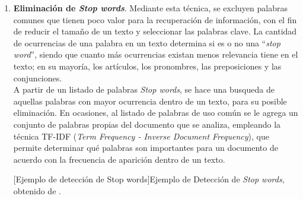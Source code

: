 \begin{enumerate}
\item \textbf{Eliminación de \textit{Stop words}}. Mediante esta técnica, se excluyen palabras comunes que tienen poco valor para la recuperación de información, con el fin de reducir el tamaño de un texto y seleccionar las palabras clave. La cantidad de ocurrencias de una palabra en un texto determina si es o no una “\textit{stop word}”, siendo que cuanto más ocurrencias existan menos relevancia tiene en el texto; en su mayoría, los artículos, los pronombres, las preposiciones y las conjunciones.\\

A partir de un listado de palabras \textit{Stop words}, se hace una busqueda de aquellas palabras con mayor ocurrencia dentro de un texto, para su posible eliminación. En ocasiones, al listado de palabras de uso común se le agrega un conjunto de palabras propias del documento que se analiza, empleando la técnica TF-IDF (\textit{Term Frequency - Inverse Document Frequency}), que permite determinar qué palabras son importantes para un documento de acuerdo con la frecuencia de aparición dentro de un texto.
\begin{center}
    [Ejemplo de detección de Stop words]{Ejemplo de Detección de \textit{Stop words}, obtenido de \cite{ref47}.}  %
\end{center}


\end{enumerate}
